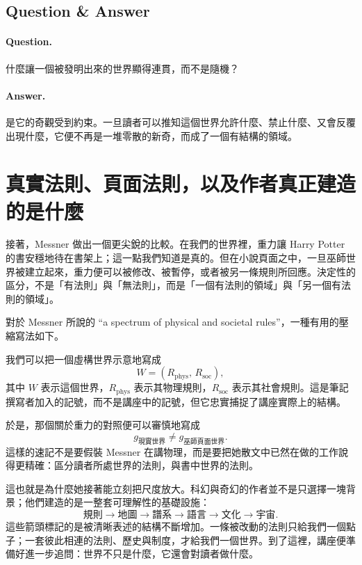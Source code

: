 \subsection{Question \& Answer}

\paragraph{Question.} 什麼讓一個被發明出來的世界顯得連貫，而不是隨機？

\paragraph{Answer.} 是它的奇觀受到約束。一旦讀者可以推知這個世界允許什麼、禁止什麼、又會反覆出現什麼，它便不再是一堆零散的新奇，而成了一個有結構的領域。

\section{真實法則、頁面法則，以及作者真正建造的是什麼}

接著，Messner 做出一個更尖銳的比較。在我們的世界裡，重力讓 Harry Potter 的書安穩地待在書架上；這一點我們知道是真的。但在小說頁面之中，一旦巫師世界被建立起來，重力便可以被修改、被暫停，或者被另一條規則所回應。決定性的區分，不是「有法則」與「無法則」，而是「一個有法則的領域」與「另一個有法則的領域」。

對於 Messner 所說的 ``a spectrum of physical and societal rules''，一種有用的壓縮寫法如下。

\begin{definition}
我們可以把一個虛構世界示意地寫成
\begin{equation}
W = (R_{\mathrm{phys}},\,R_{\mathrm{soc}}),
\end{equation}
其中 \(W\) 表示這個世界，\(R_{\mathrm{phys}}\) 表示其物理規則，\(R_{\mathrm{soc}}\) 表示其社會規則。這是筆記撰寫者加入的記號，而不是講座中的記號，但它忠實捕捉了講座實際上的結構。
\end{definition}

於是，那個關於重力的對照便可以審慎地寫成
\begin{equation}
g_{\text{現實世界}} \neq g_{\text{巫師頁面世界}}.
\end{equation}
這樣的速記不是要假裝 Messner 在講物理，而是要把她散文中已然在做的工作說得更精確：區分讀者所處世界的法則，與書中世界的法則。

這也就是為什麼她接著能立刻把尺度放大。科幻與奇幻的作者並不是只選擇一塊背景；他們建造的是一整套可理解性的基礎設施：
\begin{equation}
\text{規則} \to \text{地圖} \to \text{譜系} \to \text{語言} \to \text{文化} \to \text{宇宙}.
\end{equation}
這些箭頭標記的是被清晰表述的結構不斷增加。一條被改動的法則只給我們一個點子；一套彼此相連的法則、歷史與制度，才給我們一個世界。到了這裡，講座便準備好進一步追問：世界不只是什麼，它還會對讀者做什麼。

